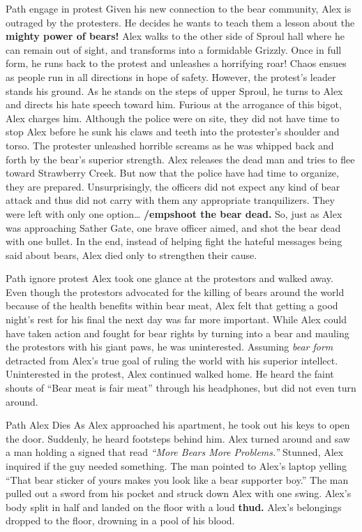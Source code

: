 \documentclass{article}
\begin{document}
Path engage in protest
Given his new connection to the bear community, Alex is outraged by the protesters. He decides he wants to teach them a lesson about the \textbf{mighty power of bears!} Alex walks to the other side of Sproul hall where he can remain out of sight, and transforms into a formidable Grizzly. Once in full form, he runs back to the protest and unleashes a horrifying roar! Chaos ensues as people run in all directions in hope of safety. However, the protest’s leader stands his ground. As he stands on the steps of upper Sproul, he turns to Alex and directs his hate speech toward him. Furious at the arrogance of this bigot, Alex charges him. Although the police were on site, they did not have time to stop Alex before he sunk his claws and teeth into the protester’s shoulder and torso. The protester unleashed horrible screams as he was whipped back and forth by the bear’s superior strength. Alex releases the dead man and tries to flee toward Strawberry Creek. But now that the police have had time to organize, they are prepared. Unsurprisingly, the officers did not expect any kind of bear attack and thus did not carry with them any appropriate tranquilizers. They were left with only one option… \textbf{/emp{shoot the bear dead.}} So, just as Alex was approaching Sather Gate, one brave officer aimed, and shot the bear dead with one bullet. In the end, instead of helping fight the hateful messages being said about bears, Alex died only to strengthen their cause. 







Path ignore protest
Alex took one glance at the protestors and walked away. Even though the protestors advocated for the killing of bears around the world because of the health benefits within bear meat, Alex felt that getting a good night’s rest for his final the next day was far more important. While Alex could have taken action and fought for bear rights by turning into a bear and mauling the protestors with his giant paws, he was uninterested. Assuming \textit {bear form} detracted from Alex’s true goal of ruling the world with his superior intellect. Uninterested in the protest, Alex continued walked home. He heard the faint shouts of “Bear meat is fair meat” through his headphones, but did not even turn around.






Path Alex Dies
As Alex approached his apartment, he took out his keys to open the door. Suddenly, he heard footsteps behind him. Alex turned around and saw a man holding a signed that read \textit {“More Bears More Problems.”} Stunned, Alex inquired if the guy needed something. The man pointed to Alex’s laptop yelling “That bear sticker of yours makes you look like a bear supporter boy.” The man pulled out a sword from his pocket and struck down Alex with one swing. Alex’s body split in half and landed on the floor with a loud \textbf {thud.} Alex’s belongings dropped to the floor, drowning in a pool of his blood.
\end{document}
